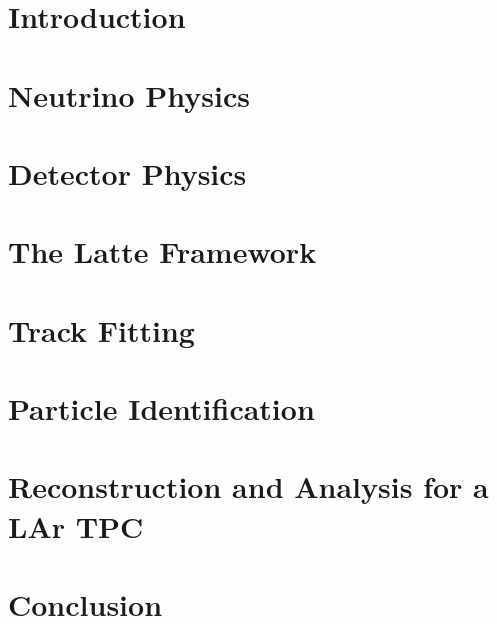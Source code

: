 \documentclass[11pt,a4paper]{scrreprt}
\begin{document}

                                  
\setcounter{chapter}{0}
\def\thechapter{\arabic{chapter}}

%
\chapter{Introduction}

%
\chapter{Neutrino Physics}

%
\chapter{Detector Physics}

%
\chapter{The Latte Framework}



%
\chapter{Track Fitting}

%
\chapter{Particle Identification}

%
\chapter{Reconstruction and Analysis for a LAr TPC}

%
\chapter{Conclusion}


\cleardoublepage %

\end{document}
